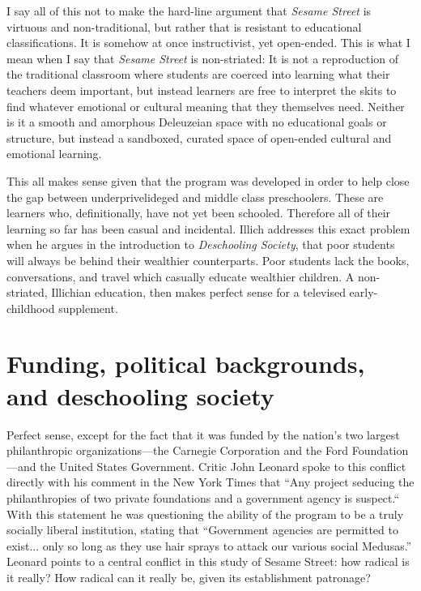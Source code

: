 \documentclass[12pt,letterpaper]{article}
\begin{document}
	I say all of this not to make the hard-line argument that \textit{Sesame
	Street} is virtuous and non-traditional, but rather that is  
	resistant to educational classifications.
	It is somehow at once instructivist, yet open-ended. This
	is what I mean when I say that \textit{Sesame Street} is non-striated: 
	It is not a reproduction of the traditional classroom where students are
	coerced into learning what their teachers deem important, but instead 
	learners are free to interpret the skits to find whatever emotional or 
	cultural meaning that they themselves need. Neither is it a smooth 
	and amorphous Deleuzeian space with no educational goals or structure, 
	but 
	instead a sandboxed, curated space of open-ended cultural and 
	emotional learning.

	This all makes sense given that the program was developed in order to 
	help close the gap between underprivelideged and middle class 
	preschoolers\autocite[sec. 1]{Cooney}. These are learners who, 
	definitionally, have not yet been schooled. Therefore all of their 
	learning so far has been casual and incidental. Illich addresses this 
	exact problem when he argues in the introduction to \textit{Deschooling
	Society}, that poor students will always be behind their wealthier
	counterparts\autocite[5]{Illich}. Poor students lack the books, 
	conversations, and travel which casually educate wealthier children.
	A non-striated, Illichian education, then makes perfect sense for
	a televised early-childhood supplement.

	\section*{Funding, political backgrounds, and deschooling society}

	Perfect sense, except for the fact that it was funded by the nation’s 
	two largest philanthropic organizations—the Carnegie Corporation and 
	the Ford Foundation—and the United States Government. Critic John 
	Leonard spoke to this conflict directly with his comment in the New 
	York Times that ``Any project seducing the philanthropies of two private
	foundations and a government agency is suspect.``
	With this statement he was questioning the ability of the program to be
	a truly socially liberal institution, stating that ``Government agencies
	are permitted to exist... only so long as they use hair sprays to 
	attack our various social Medusas.'' \autocite[146]{Davis} Leonard 
	points to a central conflict in this study of Sesame Street: how radical
	is it really? How radical can it really be, given its establishment 
	patronage?
\end{document}
